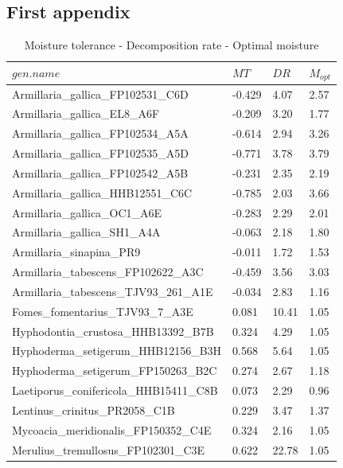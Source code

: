 \documentclass{mcmthesis}
\begin{document}
\newpage
\begin{appendices}
\section{First appendix}
\begin{table}[h]
	\centering
	\caption{Moisture tolerance - Decomposition rate - Optimal moisture}
	\begin{tabular}{p{}p{}p{}p{}}
		\hline
		$gen.name$ & $MT$ & $DR$ & $M_{opt}$ \\ 
		\hline
		Armillaria\_gallica\_FP102531\_C6D & -0.429  & 4.07  & 2.57 \\
		Armillaria\_gallica\_EL8\_A6F & -0.209  & 3.20  & 1.77 \\ 
		Armillaria\_gallica\_FP102534\_A5A & -0.614  & 2.94  & 3.26 \\
		Armillaria\_gallica\_FP102535\_A5D & -0.771  & 3.78  & 3.79 \\ 
		Armillaria\_gallica\_FP102542\_A5B & -0.231  & 2.35  & 2.19 \\ 
		Armillaria\_gallica\_HHB12551\_C6C & -0.785  & 2.03  & 3.66 \\ 
		Armillaria\_gallica\_OC1\_A6E & -0.283  & 2.29  & 2.01 \\ 
		Armillaria\_gallica\_SH1\_A4A & -0.063  & 2.18  & 1.80 \\ 
		Armillaria\_sinapina\_PR9 & -0.011  & 1.72  & 1.53 \\ 
		Armillaria\_tabescens\_FP102622\_A3C & -0.459  & 3.56  & 3.03 \\ 
		Armillaria\_tabescens\_TJV93\_261\_A1E & -0.034  & 2.83  & 1.16 \\ 
		Fomes\_fomentarius\_TJV93\_7\_A3E & 0.081  & 10.41  & 1.05 \\ 
		Hyphodontia\_crustosa\_HHB13392\_B7B & 0.324  & 4.29  & 1.05 \\ 
		Hyphoderma\_setigerum\_HHB12156\_B3H & 0.568  & 5.64  & 1.05 \\ 
		Hyphoderma\_setigerum\_FP150263\_B2C & 0.274  & 2.67  & 1.18 \\ 
		Laetiporus\_conifericola\_HHB15411\_C8B & 0.073  & 2.29  & 0.96 \\ 
		Lentinus\_crinitus\_PR2058\_C1B & 0.229  & 3.47  & 1.37 \\
		Mycoacia\_meridionalis\_FP150352\_C4E & 0.324  & 2.16  & 1.05 \\
		Merulius\_tremullosus\_FP102301\_C3E & 0.622  & 22.78  & 1.05 \\ 

\end{tabular}
\end{table}
\end{appendices}
\end{document}
